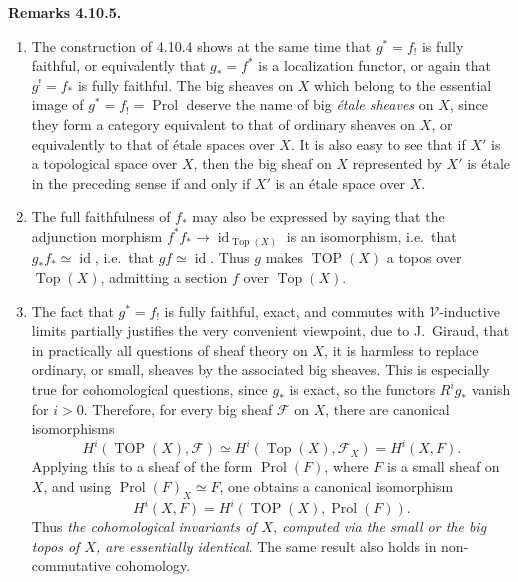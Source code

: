 \documentclass[11pt]{article}
\newcommand{\V}{\mathcal{V}}
\newcommand{\Top}{\operatorname{Top}}
\newcommand{\TOP}{\operatorname{TOP}}
\newcommand{\id}{\operatorname{id}}
\newcommand{\Prol}{\operatorname{Prol}}
\newcommand{\ie}{i.e.}
\newenvironment{remarktext}[1]{\par\medskip\noindent\textbf{#1.}\ }{\par\medskip}
\begin{document}
\begin{remarktext}{Remarks 4.10.5}
\begin{enumerate}[label=\alph*)]
\item The construction of 4.10.4 shows at the same time that \(g^\ast=f_!\) is fully faithful, or equivalently that \(g_\ast=f^\ast\) is a localization functor, or again that \(g^!=f_\ast\) is fully faithful. The big sheaves on \(X\) which belong to the essential image of \(g^\ast=f_!=\Prol\) deserve the name of big \emph{\'etale sheaves} on \(X\), since they form a category equivalent to that of ordinary sheaves on \(X\), or equivalently to that of \'etale spaces over \(X\). It is also easy to see that if \(X'\) is a topological space over \(X\), then the big sheaf on \(X\) represented by \(X'\) is \'etale in the preceding sense if and only if \(X'\) is an \'etale space over \(X\).
\item The full faithfulness of \(f_\ast\) may also be expressed by saying that the adjunction morphism \(f^\ast f_\ast\to\id_{\Top(X)}\) is an isomorphism, \ie\ that \(g_\ast f_\ast\simeq\id\), \ie\ that \(gf\simeq\id\). Thus \(g\) makes \(\TOP(X)\) a topos over \(\Top(X)\), admitting a section \(f\) over \(\Top(X)\).
\item The fact that \(g^\ast=f_!\) is fully faithful, exact, and commutes with \(\V\)-inductive limits partially justifies the very convenient viewpoint, due to J.~Giraud, that in practically all questions of sheaf theory on \(X\), it is harmless to replace ordinary, or small, sheaves by the associated big sheaves. This is especially true for cohomological questions, since \(g_\ast\) is exact, so the functors \(R^i g_\ast\) vanish for \(i>0\). Therefore, for every big sheaf \(\mathcal F\) on \(X\), there are canonical isomorphisms
\[
H^i(\TOP(X),\mathcal F)\simeq
H^i(\Top(X),\mathcal F_X)=H^i(X,F).
\]
Applying this to a sheaf of the form \(\Prol(F)\), where \(F\) is a small sheaf on \(X\), and using \(\Prol(F)_X\simeq F\), one obtains a canonical isomorphism
\[
H^i(X,F)=H^i(\TOP(X),\Prol(F)).
\]
Thus \emph{the cohomological invariants of \(X\), computed via the small or the big topos of \(X\), are essentially identical}. The same result also holds in non-commutative cohomology.
\end{enumerate}
\end{remarktext}
\end{document}
